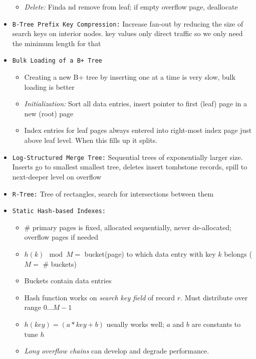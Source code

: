 \documentclass[landscape,8pt]{extarticle}
\newcommand{\code}{\lstinline}
\begin{document}
\begin{multicols}{4}
\begin{itemize}
\begin{itemize}
                  \item \emph{Delete:} Finda nd remove from leaf; if empty overflow page, deallocate
              \end{itemize}
        \item \code{B-Tree Prefix Key Compression:} Increase fan-out by reducing the size of search keys on interior nodes. key values only direct traffic so we only need the minimum length for that
        \item \code{Bulk Loading of a B+ Tree}
              \begin{itemize}
                  \item Creating a new B+ tree by inserting one at a time is very slow, bulk loading is better
                  \item \emph{Initialization:} Sort all data entries, insert pointer to first (leaf) page in a new (root) page
                  \item Index entries for leaf pages always entered into right-most index page just above leaf level. When this fills up it splits.
              \end{itemize}
        \item \code{Log-Structured Merge Tree:} Sequential trees of exponentially larger size. Inserts go to smallest smallest tree, deletes insert tombstone records, spill to next-deeper level on overflow
        \item \code{R-Tree:} Tree of rectangles, search for intersections between them
        \item \code{Static Hash-based Indexes:}
              \begin{itemize}
                  \item \# primary pages is fixed, allocated sequentially, never de-allocated; overflow pages if needed
                  \item $h(k) \mod M = $ bucket(page) to which data entry with key $k$ belongs ($M = $ \# buckets)
                  \item Buckets contain data entries
                  \item Hash function works on \emph{search key field} of record $r$. Must distribute over range $0 \dots M-1$
                  \item $h(key) = (a * key + b)$ usually works well; $a$ and $b$ are constants to tune $h$
                  \item \emph{Long overflow chains} can develop and degrade performance.
              \end{itemize}

\end{itemize}
\end{multicols}
\end{document}
